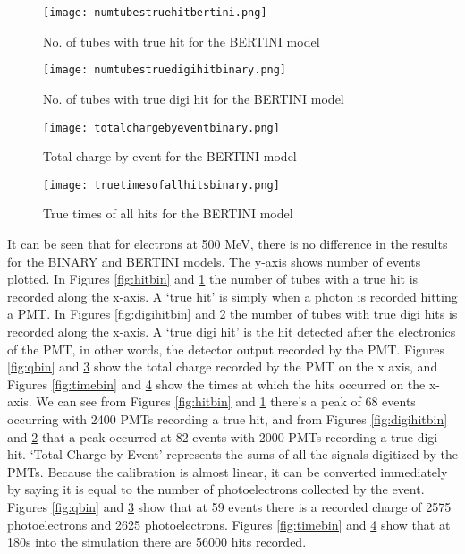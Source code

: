 \documentclass[11pt,oneside,a4paper]{article}
\begin{document}
\begin{figure}
		\centering
		\captionsetup{justification=centering}
		\texttt{[image: numtubestruehitbertini.png]}
		\caption{No. of tubes with true hit for the BERTINI model}
		\label{fig:hitbert}
\end{figure}
	\begin{figure}
		\centering
		\captionsetup{justification=centering}
		\texttt{[image: numtubestruedigihitbinary.png]}
		\caption{No. of tubes with true digi hit for the BERTINI model}
		\label{fig:digihitbert}
	\end{figure}
	
	\begin{figure}
		\centering
		\captionsetup{justification=centering}
		\texttt{[image: totalchargebyeventbinary.png]}
		\caption{Total charge by event for the BERTINI model}
		\label{fig:qbert}
	\end{figure}

\begin{figure}
		\centering
		\captionsetup{justification=centering}
		\texttt{[image: truetimesofallhitsbinary.png]}
		\caption{True times of all hits for the BERTINI model}
		\label{fig:timebert}
\end{figure}


It can be seen that for electrons at 500 MeV, there is no difference in the results for the BINARY and BERTINI models. The y-axis shows number of events plotted. In Figures \ref{fig:hitbin} and \ref{fig:hitbert} the number of tubes with a true hit is recorded along the x-axis. A `true hit' is simply when a photon is recorded hitting a PMT. In Figures \ref{fig:digihitbin} and \ref{fig:digihitbert} the number of tubes with true digi hits is recorded along the x-axis. A `true digi hit' is the hit detected after the electronics of the PMT, in other words, the detector output recorded by the PMT. Figures \ref{fig:qbin} and \ref{fig:qbert} show the total charge recorded by the PMT on the x axis, and Figures \ref{fig:timebin} and \ref{fig:timebert} show the times at which the hits occurred on the x-axis. We can see from Figures \ref{fig:hitbin} and \ref{fig:hitbert} there's a peak of 68 events occurring with 2400 PMTs recording a true hit, and from Figures \ref{fig:digihitbin} and  \ref{fig:digihitbert} that a peak occurred at 82 events with 2000 PMTs recording a true digi hit. `Total Charge by Event' represents the sums of all the signals digitized by the PMTs. Because the calibration is almost linear, it can be converted immediately by saying it is equal to the number of photoelectrons collected by the event. Figures \ref{fig:qbin} and \ref{fig:qbert} show that at 59 events there is a recorded charge of 2575 photoelectrons and 2625 photoelectrons.  Figures \ref{fig:timebin} and \ref{fig:timebert} show that at 180s into the simulation there are 56000 hits recorded.
\end{document}
